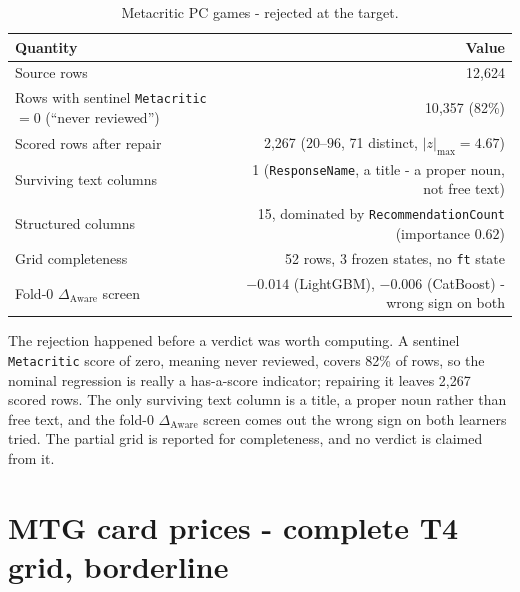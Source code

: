 \documentclass{article}
\newcommand{\daware}{\Delta_{\text{Aware}}}
\begin{document}
\begin{table}[H]
\centering\small
\caption{Metacritic PC games - rejected at the target.}
\begin{tabular}{lr}
\toprule
Quantity & Value \\
\midrule
Source rows & 12{,}624 \\
Rows with sentinel \texttt{Metacritic} $= 0$ (``never reviewed'') & 10{,}357 (82\%) \\
Scored rows after repair & 2{,}267 ($20$--$96$, 71 distinct, $|z|_{\max} = 4.67$) \\
Surviving text columns & 1 (\texttt{ResponseName}, a title - a proper noun, not free text) \\
Structured columns & 15, dominated by \texttt{RecommendationCount} (importance $0.62$) \\
Grid completeness & 52 rows, 3 frozen states, no \texttt{ft} state \\
Fold-0 $\daware$ screen & $-0.014$ (LightGBM), $-0.006$ (CatBoost) - wrong sign on both \\
\bottomrule
\end{tabular}
\end{table}

\noindent The rejection happened before a verdict was worth computing. A sentinel \texttt{Metacritic}
score of zero, meaning never reviewed, covers 82\% of rows, so the nominal regression is really
a has-a-score indicator; repairing it leaves 2{,}267 scored rows. The only surviving text
column is a title, a proper noun rather than free text, and the fold-0 $\daware$ screen comes out
the wrong sign on both learners tried. The partial grid is reported for completeness, and no
verdict is claimed from it.


\clearpage
\section{MTG card prices - complete T4 grid, borderline}
\label{app:mtg}
\end{document}
